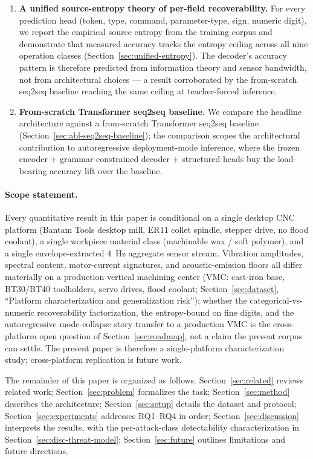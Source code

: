 \documentclass[sensors,article,submit,moreauthors,pdftex]{Definitions/mdpi}
\begin{document}
\begin{enumerate}[label=\textbf{(\arabic*)}, leftmargin=*]
\item \textbf{A unified source-entropy theory of per-field recoverability.} For every prediction head (token, type, command, parameter-type, sign, numeric digit), we report the empirical source entropy from the training corpus and demonstrate that measured accuracy tracks the entropy ceiling across all nine operation classes (Section~\ref{sec:unified-entropy}). The decoder's accuracy pattern is therefore predicted from information theory and sensor bandwidth, not from architectural choices --- a result corroborated by the from-scratch seq2seq baseline reaching the same ceiling at teacher-forced inference.

\item \textbf{From-scratch Transformer seq2seq baseline.} We compare the headline architecture against a from-scratch Transformer seq2seq baseline (Section~\ref{sec:abl-seq2seq-baseline}); the comparison scopes the architectural contribution to autoregressive deployment-mode inference, where the frozen encoder + grammar-constrained decoder + structured heads buy the load-bearing accuracy lift over the baseline.
\end{enumerate}

\paragraph{Scope statement.} Every quantitative result in this paper is conditional on a single desktop CNC platform (Bantam Tools desktop mill, ER11 collet spindle, stepper drive, no flood coolant), a single workpiece material class (machinable wax / soft polymer), and a single envelope-extracted 4~Hz aggregate sensor stream. Vibration amplitudes, spectral content, motor-current signatures, and acoustic-emission floors all differ materially on a production vertical machining center (VMC: cast-iron base, BT30/BT40 toolholders, servo drives, flood coolant; Section~\ref{sec:dataset}, ``Platform characterization and generalization risk''); whether the categorical-vs-numeric recoverability factorization, the entropy-bound on fine digits, and the autoregressive mode-collapse story transfer to a production VMC is the cross-platform open question of Section~\ref{sec:roadmap}, not a claim the present corpus can settle. The present paper is therefore a single-platform characterization study; cross-platform replication is future work.

The remainder of this paper is organized as follows. Section~\ref{sec:related} reviews related work; Section~\ref{sec:problem} formalizes the task; Section~\ref{sec:method} describes the architecture; Section~\ref{sec:setup} details the dataset and protocol; Section~\ref{sec:experiments} addresses RQ1--RQ4 in order; Section~\ref{sec:discussion} interprets the results, with the per-attack-class detectability characterization in Section~\ref{sec:disc-threat-model}; Section~\ref{sec:future} outlines limitations and future directions.
\end{document}
